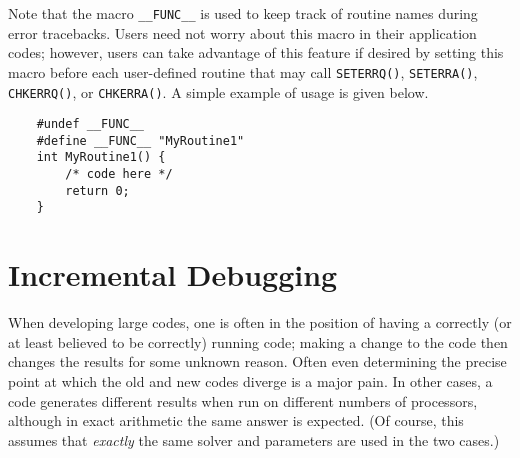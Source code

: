 {Note that the macro {\tt \_\_FUNC\_\_} is used to keep track of
routine names during error tracebacks.  Users need not worry about this
macro in their application codes; however, users can take advantage of this feature
if desired by setting this macro before each user-defined routine
that may call {\tt SETERRQ()}, {\tt SETERRA()}, {\tt CHKERRQ()},
or {\tt CHKERRA()}.  A simple example of usage is given below.
\begin{verbatim}
    #undef __FUNC__  
    #define __FUNC__ "MyRoutine1"
    int MyRoutine1() { 
        /* code here */
        return 0;
    }
\end{verbatim}

\section{Incremental Debugging} 

When developing large codes, one is often in the position of having a
correctly (or at least believed to be correctly) running code; making
a change to the code then changes the results for some unknown reason.
Often even determining the precise point at which the old and new
codes diverge is a major pain.  In other cases, a code generates
different results when run on different numbers of processors,
although in exact arithmetic the same answer is expected. (Of course,
this assumes that {\em exactly} the same solver and parameters are
used in the two cases.)
 
}
